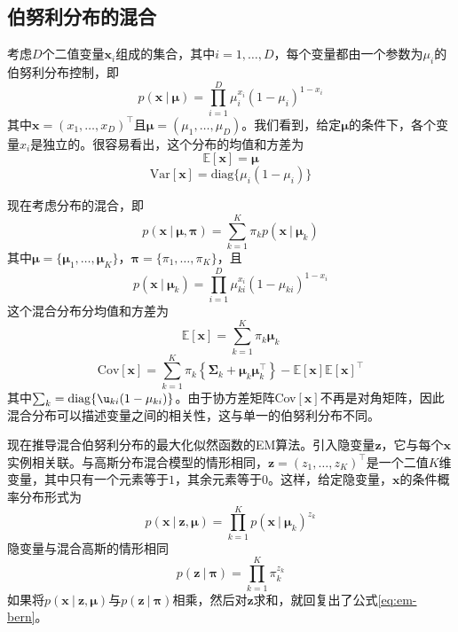 \documentclass[11pt]{ctexbook}
\begin{document}
\subsection{伯努利分布的混合}
考虑$D$个二值变量$\bm x_i$组成的集合，其中$i=1,\ldots, D$，每个变量都由一个参数为$\mu_i$的伯努利分布控制，即
\begin{equation}
	p(\bm x\ |\ \bm \mu) = \prod_{i=1}^D\mu_i^{x_i}(1-\mu_i)^{1-x_i}
\end{equation}
其中$\bm x = (x_1,\ldots,x_D)^\top$且$\bm \mu=(\mu_1, \ldots, \mu_D)$。我们看到，给定$\bm \mu$的条件下，各个变量$x_i$是独立的。很容易看出，这个分布的均值和方差为
\begin{equation}
	\mathbb E[\bm x] = \bm\mu
\end{equation}
\begin{equation}
	\mathrm{Var}[\bm x] = \mathrm{diag}\{ \mu_i(1-\mu_i) \}
\end{equation}

现在考虑分布的混合，即
\begin{equation}
	\label{eq:em-bern}
	p(\bm x\ |\ \bm\mu, \bm\pi) = \sum_{k=1}^K\pi_kp(\bm x\ |\ \bm\mu_k)
\end{equation}
其中$\bm\mu=\{\bm\mu_1,\ldots,\bm\mu_K\}$，$\bm\pi=\{\pi_1,\ldots,\pi_K\}$，且
\begin{equation}
	p(\bm x\ |\ \bm\mu_k) = \prod_{i=1}^D\mu_{ki}^{x_i}(1-\mu_{ki})^{1-x_i}
\end{equation}
这个混合分布分均值和方差为
\begin{equation}
	\mathbb E[\bm x] = \sum_{k=1}^{K}\pi_k\bm\mu_k
\end{equation}
\begin{equation}
	\mathrm{Cov}[\bm x] = \sum_{k=1}^K\pi_k\left\{ \bm\Sigma_k+\bm\mu_k\bm\mu_k^\top \right\} - \mathbb E[\bm x]\mathbb E[\bm x]^\top
\end{equation}
其中$\sum_k=\mathrm{diag}\{\u_{ki}(1-\mu_{ki})\}$。由于协方差矩阵Cov$[\bm x]$不再是对角矩阵，因此混合分布可以描述变量之间的相关性，这与单一的伯努利分布不同。

现在推导混合伯努利分布的最大化似然函数的EM算法。引入隐变量$\bm z$，它与每个$\bm x$实例相关联。与高斯分布混合模型的情形相同，$\bm z = (z_1, \ldots, z_K)^\top$是一个二值$K$维变量，其中只有一个元素等于$1$，其余元素等于$0$。这样，给定隐变量，$\bm x$的条件概率分布形式为
\begin{equation}
	p(\bm x\ |\ \bm z, \bm\mu) = \prod_{k=1}^K p(\bm x\ |\ \bm\mu_k)^{z_k}
\end{equation}
隐变量与混合高斯的情形相同
\begin{equation}
	p(\bm z\ |\ \bm\pi) = \prod_{k=1}^K \pi_k^{z_k}
\end{equation}
如果将$p(\bm x\ |\ \bm z, \bm\mu)$与$p(\bm z\ |\ \bm\pi)$相乘，然后对$\bm z$求和，就回复出了公式\ref{eq:em-bern}。
\end{document}
